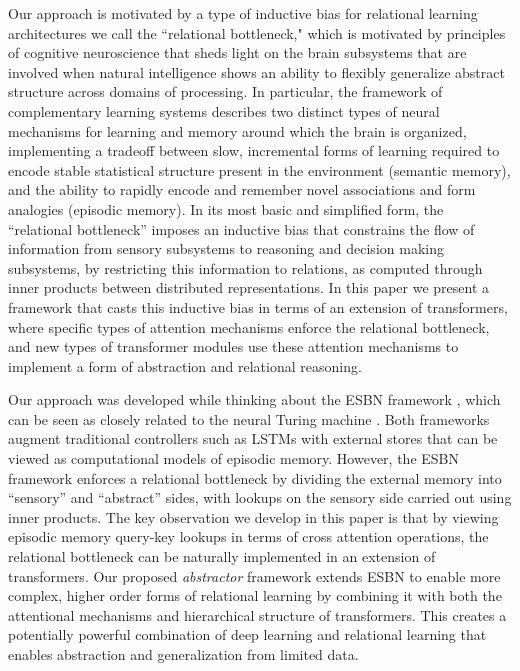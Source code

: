 Our approach is motivated by a type of inductive bias for relational learning architectures we call the ``relational bottleneck," which is motivated by principles of cognitive neuroscience that sheds light on the brain subsystems that are involved when natural intelligence shows an ability to flexibly generalize abstract structure across domains of processing. In particular, the framework of complementary learning systems \citep{McClelland:1995, Kumaran:2016} describes two distinct types of neural mechanisms for learning and memory around which the brain is organized, implementing a tradeoff between slow, incremental forms of learning required to encode stable statistical structure present in the environment (semantic memory), and the ability to rapidly encode and remember novel associations and form analogies (episodic memory). In its most basic and simplified form, the ``relational bottleneck'' imposes an inductive bias that constrains the flow of information from sensory subsystems to reasoning and decision making subsystems, by restricting this information to relations, as computed through inner products between distributed representations. In this paper we present a framework that casts this inductive bias in terms of 
an extension of transformers, where specific types of attention mechanisms enforce the relational bottleneck, 
and new types of transformer modules use these attention mechanisms to implement a form of abstraction and relational reasoning.

Our approach was developed while thinking about the ESBN framework \citep{esbn}, which can be seen as 
closely related to the neural Turing machine \citep{NTM}. Both frameworks augment traditional controllers such as 
LSTMs with external stores that can be viewed as computational models of episodic memory. However, the ESBN framework enforces a relational bottleneck by dividing the external memory into ``sensory'' and ``abstract'' sides, with lookups on the sensory side carried out using inner products. The key observation we develop in this paper is that by viewing episodic memory query-key lookups in terms of cross attention operations, the relational bottleneck can be 
naturally implemented in an extension of transformers. Our proposed \textit{abstractor} framework extends ESBN to enable more complex, higher order forms of relational learning by combining it with both the attentional mechanisms and hierarchical structure of transformers. This creates a potentially powerful combination of deep learning and relational learning that enables abstraction and generalization from limited data.




